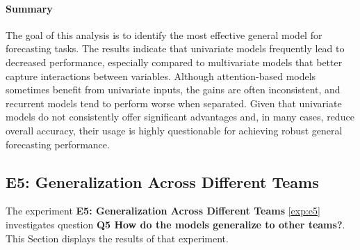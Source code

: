 \paragraph {Summary}
The goal of this analysis is to identify the most effective general model for forecasting tasks. The results indicate that univariate models frequently lead to decreased performance, especially compared to multivariate models that better capture interactions between variables. Although attention-based models sometimes benefit from univariate inputs, the gains are often inconsistent, and recurrent models tend to perform worse when separated. Given that univariate models do not consistently offer significant advantages and, in many cases, reduce overall accuracy, their usage is highly questionable for achieving robust general forecasting performance.

\FloatBarrier
\subsection{E5: Generalization Across Different Teams}
\label{exp:intra_inter}
The experiment \textbf{E5: Generalization Across Different Teams} \ref{exp:e5} investigates question \textbf{Q5 How do the models generalize to other teams?}. This Section displays the results of that experiment. 
\newpage
